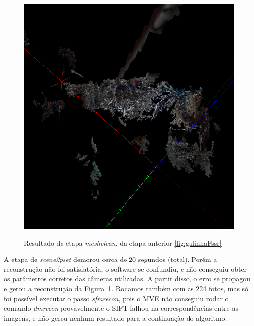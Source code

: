 \begin{figure}[!h]
	\centering
		\caption{%
	Resultado da etapa \emph{meshclean}, da etapa anterior \ref{fig:galinhaFssr}
	}
	\includegraphics[width=0.7\linewidth]{figs/galinhameshclean.png}
		\label{fig:galinhaMeshClean}
\end{figure}

A etapa de \emph{scene2pset} demorou cerca de 20 segundos (total). Porém
a reconstrução não foi satisfatória, o software se confundiu, e
não conseguiu obter os parâmetros corretos das câmeras utilizadas. A partir
disso, o erro se propagou e gerou a reconstrução da Figura~\ref{fig:galinhaMeshClean}.  Rodamos também com as 224 fotos, mas só foi possível
executar o passo \emph{sfmrecon}, pois o MVE não
conseguiu rodar o comando \emph{dmrecon} provavelmente o SIFT falhou na correspondências entre as imagens, e não gerou nenhum
resultado para a continuação do algoritmo.%



